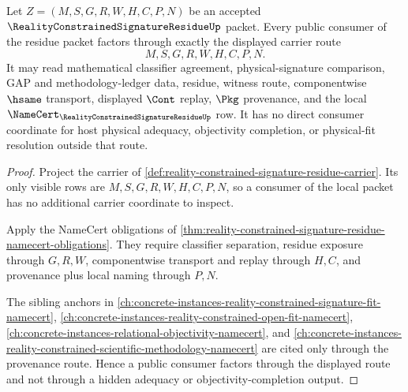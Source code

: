 \begin{theorem}
\label{thm:reality-constrained-signature-residue-consumer-boundary}
Let $Z=(M,S,G,R,W,H,C,P,N)$ be an accepted $\RealityConstrainedSignatureResidueUp$ packet. Every public consumer of the residue packet factors through exactly the displayed carrier route
$$
M,S,G,R,W,H,C,P,N.
$$
It may read mathematical classifier agreement, physical-signature comparison, GAP and methodology-ledger data, residue, witness route, componentwise $\hsame$ transport, displayed $\Cont$ replay, $\Pkg$ provenance, and the local $\NameCert_{\RealityConstrainedSignatureResidueUp}$ row. It has no direct consumer coordinate for host physical adequacy, objectivity completion, or physical-fit resolution outside that route.
\end{theorem}
\begin{proof}
Project the carrier of \autoref{def:reality-constrained-signature-residue-carrier}. Its only visible rows are $M,S,G,R,W,H,C,P,N$, so a consumer of the local packet has no additional carrier coordinate to inspect.

Apply the NameCert obligations of \autoref{thm:reality-constrained-signature-residue-namecert-obligations}. They require classifier separation, residue exposure through $G,R,W$, componentwise transport and replay through $H,C$, and provenance plus local naming through $P,N$.

The sibling anchors in \autoref{ch:concrete-instances-reality-constrained-signature-fit-namecert}, \autoref{ch:concrete-instances-reality-constrained-open-fit-namecert}, \autoref{ch:concrete-instances-relational-objectivity-namecert}, and \autoref{ch:concrete-instances-reality-constrained-scientific-methodology-namecert} are cited only through the provenance route. Hence a public consumer factors through the displayed route and not through a hidden adequacy or objectivity-completion output.
\end{proof}

